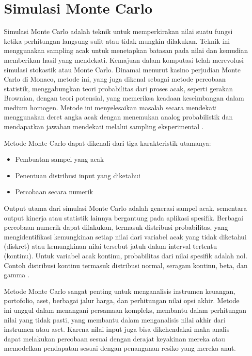 \section{Simulasi Monte Carlo}
\label{sec:montecarlo-simulation}

Simulasi Monte Carlo adalah teknik untuk memperkirakan nilai suatu fungsi ketika perhitungan langsung sulit atau tidak mungkin dilakukan. Teknik ini menggunakan sampling acak untuk menetapkan batasan pada nilai dan kemudian memberikan hasil yang mendekati. Kemajuan dalam komputasi telah merevolusi simulasi stokastik atau Monte Carlo. Dinamai menurut kasino perjudian Monte Carlo di Monaco, metode ini, yang juga dikenal sebagai metode percobaan statistik, menggabungkan teori probabilitas dari proses acak, seperti gerakan Brownian, dengan teori potensial, yang memeriksa keadaan keseimbangan dalam medium homogen. Metode ini menyelesaikan masalah secara mendekati menggunakan deret angka acak dengan menemukan analog probabilistik dan mendapatkan jawaban mendekati melalui sampling eksperimental \citep{Muqri_2020}.

Metode Monte Carlo dapat dikenali dari tiga karakteristik utamanya:

\begin{itemize}
    \item Pembuatan sampel yang acak
    \item Penentuan distribusi input yang diketahui
    \item Percobaan secara numerik
\end{itemize}

Output utama dari simulasi Monte Carlo adalah generasi sampel acak, sementara output kinerja atau statistik lainnya bergantung pada aplikasi spesifik. Berbagai percobaan numerik dapat dilakukan, termasuk distribusi probabilitas, yang mengidentifikasi kemungkinan setiap nilai dari variabel acak yang tidak diketahui (diskret) atau kemungkinan nilai tersebut jatuh dalam interval tertentu (kontinu). Untuk variabel acak kontinu, probabilitas dari nilai spesifik adalah nol. Contoh distribusi kontinu termasuk distribusi normal, seragam kontinu, beta, dan gamma \citep{Muqri_2020}.

Metode Monte Carlo sangat penting untuk menganalisis instrumen keuangan, portofolio, aset, berbagai jalur harga, dan perhitungan nilai opsi akhir. Metode ini unggul dalam menangani persamaan kompleks, membantu dalam perhitungan nilai yang tidak pasti, yang membantu dalam menganalisis nilai akhir dari instrumen atau aset. Karena nilai input juga bisa dikehendakai maka analis dapat melakukan percobaan sesuai dengan derajat keyakinan mereka atau memodelkan pendapatan sesuai dengan penanganan resiko yang mereka anut.

